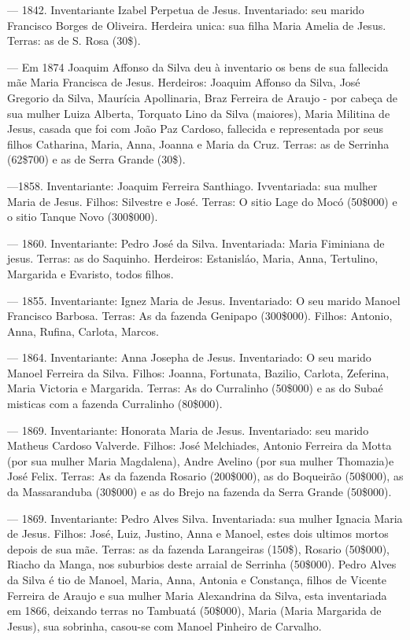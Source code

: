 — 1842. Inventariante Izabel Perpetua de Jesus. Inventariado: seu marido Francisco Borges de Oliveira. Herdeira unica: sua filha Maria Amelia de Jesus. Terras: as de S. Rosa (30\$).

— Em 1874 Joaquim Affonso da Silva deu à inventario os bens de sua fallecida mãe Maria Francisca de Jesus. Herdeiros: Joaquim Affonso da Silva, José Gregorio da Silva, Maurícia Apollinaria, Braz Ferreira de Araujo - por cabeça de sua mulher Luiza Alberta, Torquato Lino da Silva (maiores), Maria Militina de Jesus, casada que foi com João Paz Cardoso, fallecida e representada por seus filhos Catharina, Maria, Anna, Joanna e Maria da Cruz. Terras: as de Serrinha (62\$700) e as de Serra Grande (30\$).

—1858. Inventariante: Joaquim Ferreira Santhiago. Ivventariada: sua mulher Maria de Jesus. Filhos: Silvestre e José. Terras: O sitio Lage do Mocó (50\$000) e o sitio Tanque Novo (300\$000).

— 1860. Inventariante:  Pedro  José da Silva. Inventariada: Maria Fiminiana de jesus. Terras: as do Saquinho. Herdeiros: Estanisláo, Maria, Anna, Tertulino, Margarida e Evaristo, todos filhos.

— 1855. Inventariante: Ignez Maria de Jesus. Inventariado: O seu marido Manoel Francisco Barbosa. Terras: As da fazenda Genipapo (300\$000). Filhos: Antonio, Anna, Rufina, Carlota, Marcos.

— 1864. Inventariante: Anna Josepha de Jesus. Inventariado: O seu marido Manoel Ferreira da Silva. Filhos: Joanna, Fortunata, Bazilio, Carlota, Zeferina, Maria Victoria e Margarida. Terras: As do Curralinho (50\$000) e as do Subaé misticas com a fazenda Curralinho (80\$000).

— 1869. Inventariante: Honorata Maria de Jesus. Inventariado: seu marido Matheus Cardoso Valverde. Filhos: José Melchiades, Antonio Ferreira da Motta (por sua mulher Maria  Magdalena), Andre  Avelino (por sua mulher Thomazia)e José Felix. Terras: As da fazenda Rosario (200\$000), as do Boqueirão (50\$000), as da Massaranduba (30\$000) e as do Brejo na fazenda da Serra Grande (50\$000).

— 1869. Inventariante: Pedro Alves Silva. Inventariada: sua mulher Ignacia Maria de Jesus. Filhos: José, Luiz, Justino, Anna e Manoel, estes dois ultimos mortos depois de sua mãe. Terras: as da fazenda Larangeiras (150\$), Rosario (50\$000), Riacho da Manga, nos suburbios deste arraial de Serrinha (50\$000). Pedro Alves da Silva é tio de Manoel, Maria, Anna, Antonia e Constança, filhos de Vicente Ferreira de Araujo e sua mulher Maria Alexandrina da Silva, esta inventariada em 1866, deixando terras no Tambuatá (50\$000), Maria (Maria Margarida de Jesus), sua sobrinha, casou-se com Manoel Pinheiro de Carvalho.

